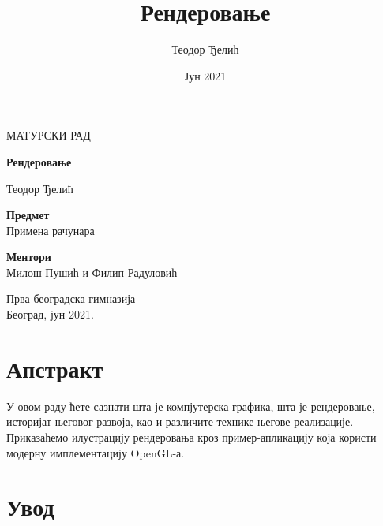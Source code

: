 \documentclass[12pt]{article}
\title{Рендеровање}
\author{Теодор Ђелић}
\date{Јун 2021}
\begin{document}
	\begin{titlepage}
		\begin{center}
			\vspace*{1cm}
			
			\LARGE
			
			МАТУРСКИ РАД\\
			
			
			\vspace{1cm}
			
			\Huge
			\textbf{Рендеровање}
			
			\vspace{0.5cm}
			
			\LARGE
			Теодор Ђелић
			
			\vspace{1cm}
			
			\Large
			\textbf{Предмет}\\
			\Large
			Примена рачунара\\
			
			\vspace{0.5cm}
			
			\Large
			\textbf{Ментори}\\
			\Large
			Милош Пушић и Филип Радуловић\\
			
			\vfill
			
			\vspace{0.8cm}
			
			\large
			
			Прва београдска гимназија\\
			Београд, јун 2021.\\
			
		\end{center}
	\end{titlepage}
	
	\tableofcontents
	
	\pagebreak
	
	\section*{Апстракт}
	У овом раду ћете сазнати шта је компјутерска графика, шта је рендеровање, историјат његовог развоја, као и различите технике његове реализације. Приказаћемо илустрацију рендеровања кроз пример-апликацију која користи модерну имплементацију OpenGL-а.
	
	\section{Увод}
	
\end{document}
